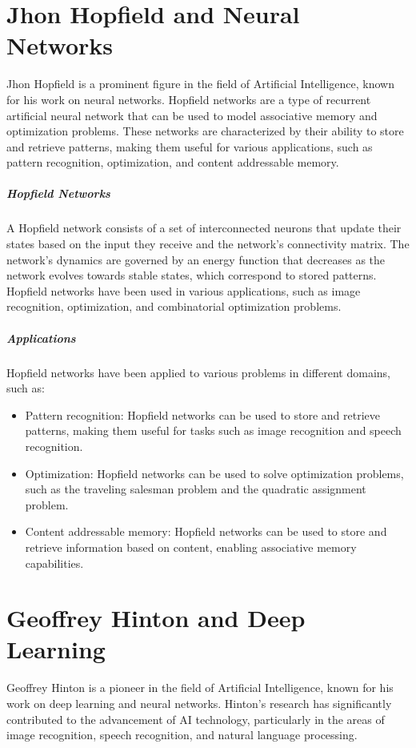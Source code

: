 \documentclass{article}
\begin{document}
\section{Jhon Hopfield and Neural Networks}
Jhon Hopfield is a prominent figure in the field of Artificial Intelligence, known for his work on neural networks. Hopfield networks are a type of recurrent artificial neural network that can be used to model associative memory and optimization problems. These networks are characterized by their ability to store and retrieve patterns, making them useful for various applications, such as pattern recognition, optimization, and content addressable memory.

\subparagraph{Hopfield Networks}
A Hopfield network consists of a set of interconnected neurons that update their states based on the input they receive and the network's connectivity matrix. The network's dynamics are governed by an energy function that decreases as the network evolves towards stable states, which correspond to stored patterns. Hopfield networks have been used in various applications, such as image recognition, optimization, and combinatorial optimization problems.

\subparagraph{Applications}
Hopfield networks have been applied to various problems in different domains, such as:

\begin{itemize}
    \item Pattern recognition: Hopfield networks can be used to store and retrieve patterns, making them useful for tasks such as image recognition and speech recognition.
    \item Optimization: Hopfield networks can be used to solve optimization problems, such as the traveling salesman problem and the quadratic assignment problem.
    \item Content addressable memory: Hopfield networks can be used to store and retrieve information based on content, enabling associative memory capabilities.
\end{itemize}

\section{Geoffrey Hinton and Deep Learning}
Geoffrey Hinton is a pioneer in the field of Artificial Intelligence, known for his work on deep learning and neural networks. Hinton's research has significantly contributed to the advancement of AI technology, particularly in the areas of image recognition, speech recognition, and natural language processing.
\end{document}

